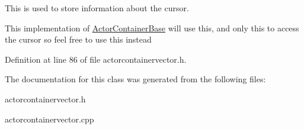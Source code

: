 This is used to store information about the cursor. 

This implementation of \hyperlink{classphys_1_1ActorContainerBase}{ActorContainerBase} will use this, and only this to access the cursor so feel free to use this instead 

Definition at line 86 of file actorcontainervector.h.



The documentation for this class was generated from the following files:\begin{DoxyCompactItemize}
\item 
actorcontainervector.h\item 
actorcontainervector.cpp\end{DoxyCompactItemize}
